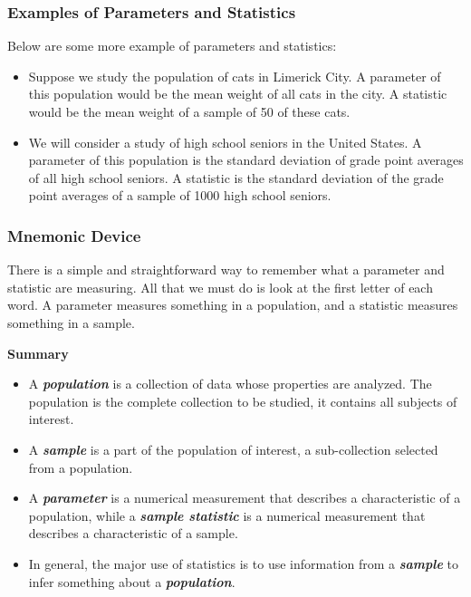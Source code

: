 \documentclass[a4paper,12pt]{article}
\begin{document}
\subsubsection*{Examples of Parameters and Statistics}

Below are some more example of parameters and statistics:

\begin{itemize}
\item Suppose we study the population of cats in Limerick City. A parameter of this population would be the mean weight of all cats in the city. A statistic would be the mean weight of a sample of 50 of these cats.
\item We will consider a study of high school seniors in the United States. A parameter of this population is the standard deviation of grade point averages of all high school seniors. A statistic is the standard deviation of the grade point averages of a sample of 1000 high school seniors.
\end{itemize}



\subsubsection*{Mnemonic Device}

There is a simple and straightforward way to remember what a parameter and statistic are measuring. All that we must do is look at the first letter of each word. A parameter measures something in a population, and a statistic measures something in a sample.


\begin{framed}
\noindent \textbf{Summary}
\begin{itemize}
	
	
	\item A \textit{\textbf{population}} is a collection of data whose properties are analyzed. The population is the complete collection to be studied, it contains all subjects of interest.
	
	\item A \textit{\textbf{sample}} is a part of the population of interest, a sub-collection selected from a population.
	
	\item
	A \textit{\textbf{parameter}} is a numerical measurement that describes a characteristic of a population, while a \textit{\textbf{sample statistic}} is a numerical measurement that describes a characteristic of a sample.
	
	\item In general, the major use of statistics is to use information from a \textit{\textbf{sample}} to infer something about a \textit{\textbf{population}}.

\end{itemize}
\end{framed}
\newpage
\end{document}
